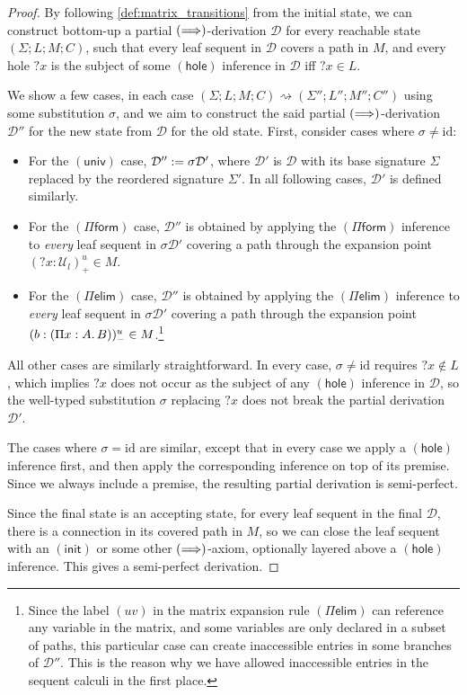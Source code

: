 \documentclass[twoside]{report}
\begin{document}
\begin{proof}
By following \cref{def:matrix_transitions} from the initial state, we can construct bottom-up a partial $(\Longrightarrow)$-derivation $\mathcal D$ for every reachable state $(\Sigma; L; M; C)$, such that every leaf sequent in $\mathcal D$ covers a path in $M$, and every hole ${?x}$ is the subject of some $(\mathsf{hole})$ inference in $\mathcal D$ iff ${?x} \in L$.

We show a few cases, in each case $(\Sigma; L; M; C) \rightsquigarrow (\Sigma''; L''; M''; C'')$ using some substitution $\sigma$, and we aim to construct the said partial $(\Longrightarrow)$-derivation $\mathcal D''$ for the new state from $\mathcal D$ for the old state. First, consider cases where $\sigma \neq \mathrm{id}$:
\begin{itemize}
    \item For the $(\mathsf{univ})$ case, $\mathcal D'' := \sigma \mathcal D'$, where $\mathcal D'$ is $\mathcal D$ with its base signature $\Sigma$ replaced by the reordered signature $\Sigma'$. In all following cases, $\mathcal D'$ is defined similarly.

    \item For the $(\Pi\mathsf{form})$ case, $\mathcal D''$ is obtained by applying the $(\Pi\mathsf{form})$ inference to \emph{every} leaf sequent in $\sigma \mathcal D'$ covering a path through the expansion point $({?x} : \mathcal U_l)^u_+ \in M$.

    \item For the $(\Pi\mathsf{elim})$ case, $\mathcal D''$ is obtained by applying the $(\Pi\mathsf{elim})$ inference to \emph{every} leaf sequent in $\sigma \mathcal D'$ covering a path through the expansion point $(b : (\Pi{x} : {A}.\,{B}))^u_- \in M$.\footnote{Since the label $(uv)$ in the matrix expansion rule $(\Pi\mathsf{elim})$ can reference any variable in the matrix, and some variables are only declared in a subset of paths, this particular case can create inaccessible entries in some branches of $\mathcal D''$. This is the reason why we have allowed inaccessible entries in the sequent calculi in the first place.}
\end{itemize}
All other cases are similarly straightforward. In every case, $\sigma \neq \mathrm{id}$ requires ${?x} \notin L$, which implies ${?x}$ does not occur as the subject of any $(\mathsf{hole})$ inference in $\mathcal D$, so the well-typed substitution $\sigma$ replacing ${?x}$ does not break the partial derivation $\mathcal D'$.

The cases where $\sigma = \mathrm{id}$ are similar, except that in every case we apply a $(\mathsf{hole})$ inference first, and then apply the corresponding inference on top of its premise. Since we always include a premise, the resulting partial derivation is semi-perfect.

Since the final state is an accepting state, for every leaf sequent in the final $\mathcal D$, there is a connection in its covered path in $M$, so we can close the leaf sequent with an $(\mathsf{init})$ or some other $(\Longrightarrow)$-axiom, optionally layered above a $(\mathsf{hole})$ inference. This gives a semi-perfect derivation.
\end{proof}
\end{document}
